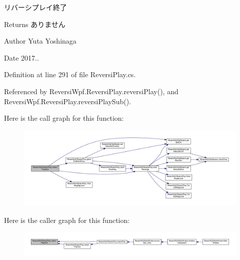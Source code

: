 リバーシプレイ終了 

\begin{DoxyReturn}{Returns}
ありません 
\end{DoxyReturn}
\begin{DoxyAuthor}{Author}
Yuta Yoshinaga 
\end{DoxyAuthor}
\begin{DoxyDate}{Date}
2017.. 
\end{DoxyDate}


Definition at line 291 of file Reversi\+Play.\+cs.



Referenced by Reversi\+Wpf.\+Reversi\+Play.\+reversi\+Play(), and Reversi\+Wpf.\+Reversi\+Play.\+reversi\+Play\+Sub().

Here is the call graph for this function\+:
\nopagebreak
\begin{figure}[H]
\begin{center}
\leavevmode
\includegraphics[width=350pt]{class_reversi_wpf_1_1_reversi_play_a091d27bec4b3570ab595a49170342105_cgraph}
\end{center}
\end{figure}
Here is the caller graph for this function\+:
\nopagebreak
\begin{figure}[H]
\begin{center}
\leavevmode
\includegraphics[width=350pt]{class_reversi_wpf_1_1_reversi_play_a091d27bec4b3570ab595a49170342105_icgraph}
\end{center}
\end{figure}
\mbox{\label{class_reversi_wpf_1_1_reversi_play_a3aca2f66c873be50dca194a396d34bd7}} 
